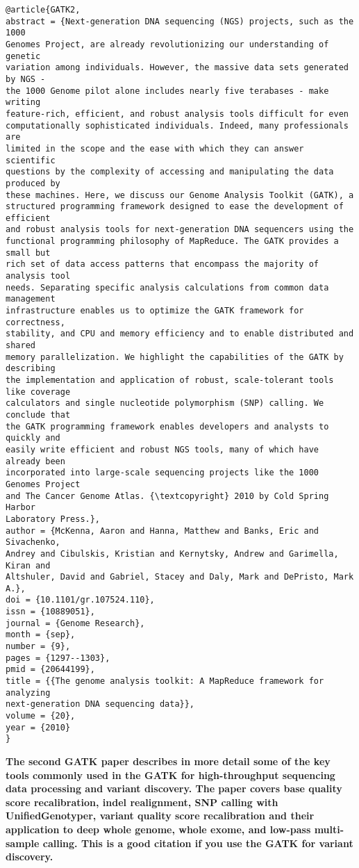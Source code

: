 \documentclass[]{article}
\begin{document}
\begin{verbatim}
@article{GATK2,
abstract = {Next-generation DNA sequencing (NGS) projects, such as the 1000
Genomes Project, are already revolutionizing our understanding of genetic
variation among individuals. However, the massive data sets generated by NGS -
the 1000 Genome pilot alone includes nearly five terabases - make writing
feature-rich, efficient, and robust analysis tools difficult for even
computationally sophisticated individuals. Indeed, many professionals are
limited in the scope and the ease with which they can answer scientific
questions by the complexity of accessing and manipulating the data produced by
these machines. Here, we discuss our Genome Analysis Toolkit (GATK), a
structured programming framework designed to ease the development of efficient
and robust analysis tools for next-generation DNA sequencers using the
functional programming philosophy of MapReduce. The GATK provides a small but
rich set of data access patterns that encompass the majority of analysis tool
needs. Separating specific analysis calculations from common data management
infrastructure enables us to optimize the GATK framework for correctness,
stability, and CPU and memory efficiency and to enable distributed and shared
memory parallelization. We highlight the capabilities of the GATK by describing
the implementation and application of robust, scale-tolerant tools like coverage
calculators and single nucleotide polymorphism (SNP) calling. We conclude that
the GATK programming framework enables developers and analysts to quickly and
easily write efficient and robust NGS tools, many of which have already been
incorporated into large-scale sequencing projects like the 1000 Genomes Project
and The Cancer Genome Atlas. {\textcopyright} 2010 by Cold Spring Harbor
Laboratory Press.},
author = {McKenna, Aaron and Hanna, Matthew and Banks, Eric and Sivachenko,
Andrey and Cibulskis, Kristian and Kernytsky, Andrew and Garimella, Kiran and
Altshuler, David and Gabriel, Stacey and Daly, Mark and DePristo, Mark A.},
doi = {10.1101/gr.107524.110},
issn = {10889051},
journal = {Genome Research},
month = {sep},
number = {9},
pages = {1297--1303},
pmid = {20644199},
title = {{The genome analysis toolkit: A MapReduce framework for analyzing
next-generation DNA sequencing data}},
volume = {20},
year = {2010}
}
\end{verbatim}

\textbf{The second GATK paper describes in more detail some of the key tools commonly used in the GATK for high-throughput sequencing data processing and variant discovery. The paper covers base quality score recalibration, indel realignment, SNP calling with UnifiedGenotyper, variant quality score recalibration and their application to deep whole genome, whole exome, and low-pass multi-sample calling. This is a good citation if you use the GATK for variant discovery.}
\end{document}
